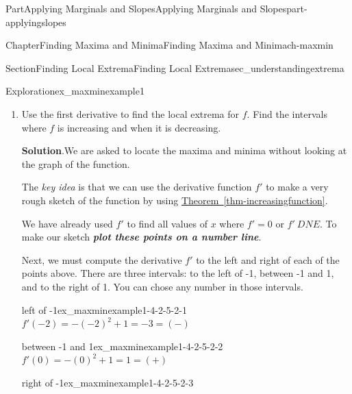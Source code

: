 \documentclass[oneside,10pt,]{tufte-book}
\newcommand{\blocktitlefont}{\relax}
\newcommand{\xreffont}{\relax}
\newcommand{\alert}[1]{\textbf{\textit{#1}}}
\numberwithin{equation}{chapter}
\begin{document}
\begin{partptx}{Part}{Applying Marginals and Slopes}{}{Applying Marginals and Slopes}{}{}{part-applyingslopes}
\begin{chapterptx}{Chapter}{Finding Maxima and Minima}{}{Finding Maxima and Minima}{}{}{ch-maxmin}
\begin{sectionptx}{Section}{Finding Local Extrema}{}{Finding Local Extrema}{}{}{sec_understandingextrema}
\begin{exploration}{Exploration}{}{ex_maxminexample1}
\begin{enumerate}[font=\bfseries,label=(\alph*),ref=\alph*]
%
\par
Looking at the graph, we can see that there is a local maxima at \(x=1\) and a local minima at \(x=-1\). We also know that there are no other locations where there \emph{might} be a maxima or minima, even off the screen of the calculator.%
\par
In particular, this tells us that there are \emph{no} absolute maxima or minima.%
\item{}Use the first derivative to find the local extrema for \(f\). Find the intervals where \(f\) is increasing and when it is decreasing.%
\par\smallskip%
\noindent\textbf{\blocktitlefont Solution}.\hypertarget{ex_maxminexample1-4-2}{}\quad{}We are asked to locate the maxima and minima without looking at the graph of the function.%
\par
The \emph{key idea} is that we can use  the derivative function \(f'\) to make a very rough sketch of the function by using \hyperref[thm-increasingfunction]{Theorem~{\xreffont\ref{thm-increasingfunction}}}.%
\par
We have already used \(f'\) to find all values of \(x\) where \(f'=0\) or \(f'\ DNE\). To make our sketch \alert{plot these points on a number line}.%
\par
\begin{image}{0.25}{0.5}{0.25}{}%
%
\end{image}%
%
\par
Next, we must compute the derivative \(f'\) to the left and right of each of the points above. There are three intervals: to the left of -1, between -1 and 1, and to the right of 1.  You can chose any number in those intervals.%
\begin{descriptionlist}
\begin{dlimedium}{left of -1}{ex_maxminexample1-4-2-5-2-1}%
 \(f'(-2) = -(-2)^2 + 1 = -3 = (-)\)\end{dlimedium}%
\begin{dlimedium}{between -1 and 1}{ex_maxminexample1-4-2-5-2-2}%
 \(f'(0) = -(0)^2 + 1 = 1 = (+)\)\end{dlimedium}%
\begin{dlimedium}{right of -1}{ex_maxminexample1-4-2-5-2-3}%

\end{dlimedium}
\end{descriptionlist}
\end{enumerate}
\end{exploration}
\end{sectionptx}
\end{chapterptx}
\end{partptx}
\end{document}
